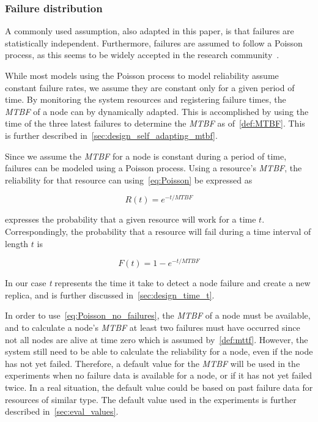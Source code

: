 \documentclass{cslthse-msc}
\begin{document}
\subsubsection{Failure distribution} \label{design:failure_distribution}
A commonly used assumption, also adapted in this paper, is that failures are statistically independent. Furthermore, failures are assumed to follow a Poisson process, as this seems to be widely accepted in the research community~\cite{experimentalFailureAssessment}. 

While most models using the Poisson process to model reliability assume constant failure rates, we assume they are constant only for a given period of time. By monitoring the system resources and registering failure times, the \emph{MTBF} of a node can by dynamically adapted. This is accomplished by using the time of the three latest failures to determine the \emph{MTBF} as of~\cref{def:MTBF}. This is further described in~\cref{sec:design_self_adapting_mtbf}. 

Since we assume the \emph{MTBF} for a node is constant during a period of time, failures can be modeled using a Poisson process. Using a resource's \emph{MTBF}, the reliability for that resource can using~\cref{eq:Poisson} be expressed as
 
\begin{equation} \label{eq:resource_reliability}
R(t) = e^{-t/MTBF}
\end{equation}

 expresses the probability that a given resource will work for a time $t$. Correspondingly, the probability that a resource will fail during a time interval of length $t$ is

\begin{equation} \label{eq:resource_failure_prob}
F(t) = 1- e^{-t/MTBF}
\end{equation}

In our case \emph{t} represents the time it take to detect a node failure and create a new replica, and is further discussed in~\cref{sec:design_time_t}.

In order to use~\cref{eq:Poisson_no_failures}, the \emph{MTBF} of a node must be available, and to calculate a node's \emph{MTBF} at least two failures must have occurred since not all nodes are alive at time zero which is assumed by~\cref{def:mttf}. However, the system still need to be able to calculate the reliability for a node, even if the node has not yet failed. Therefore, a default value for the \emph{MTBF} will be used in the experiments when no failure data is available for a node, or if it has not yet failed twice. In a real situation, the default value could be based on past failure data for resources of similar type. The default value used in the experiments is further described in~\cref{sec:eval_values}.
\end{document}

